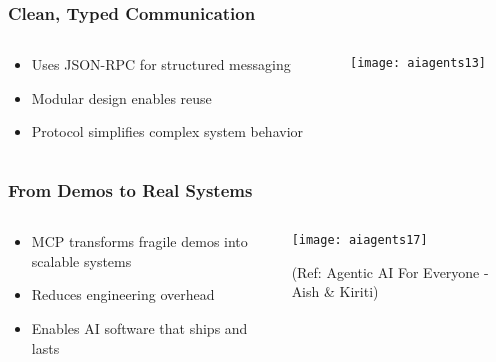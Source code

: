 \begin{frame}[fragile]\frametitle{Clean, Typed Communication}
\begin{columns}
    \begin{column}[T]{0.5\linewidth}
      \begin{itemize}
        \item Uses JSON-RPC for structured messaging
        \item Modular design enables reuse
        \item Protocol simplifies complex system behavior
      \end{itemize}

    \end{column}
    \begin{column}[T]{0.5\linewidth}
		\begin{center}
		\texttt{[image: aiagents13]}
		\end{center}
    \end{column}
  \end{columns}
\end{frame}

\begin{frame}[fragile]\frametitle{From Demos to Real Systems}

\begin{columns}
    \begin{column}[T]{0.5\linewidth}
      \begin{itemize}
        \item MCP transforms fragile demos into scalable systems
        \item Reduces engineering overhead
        \item Enables AI software that ships and lasts
      \end{itemize}

    \end{column}
    \begin{column}[T]{0.5\linewidth}
		\begin{center}
		\texttt{[image: aiagents17]}
		
		{\tiny (Ref: Agentic AI For Everyone - Aish \& Kiriti)}
		\end{center}
    \end{column}
  \end{columns}
  
	
\end{frame}

